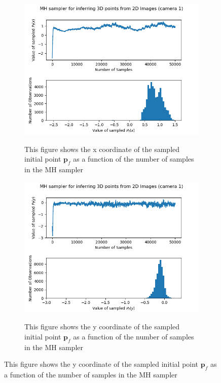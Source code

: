 \documentclass[10pt]{article}
\begin{document}
\begin{enumerate}
\begin{figure}[h!]
\centering
\begin{subfigure}[]{.320\textwidth}
  \centering
  \includegraphics[width=1\linewidth]{figures/p_f_x.png}
  \label{fig:t2pfx}
\caption{This figure shows the x coordinate of the sampled initial point $\mathbf{p}_f$ as a function of the number of samples in the MH sampler}
\end{subfigure}
\begin{subfigure}[]{.320\textwidth}
  \centering
  \includegraphics[width=1\linewidth]{figures/p_f_y.png}
  \label{fig:t2pfy}
\caption{This figure shows the y coordinate of the sampled initial point $\mathbf{p}_f$ as a function of the number of samples in the MH sampler}

\end{subfigure}
\end{figure}
\end{enumerate}
\end{document}
